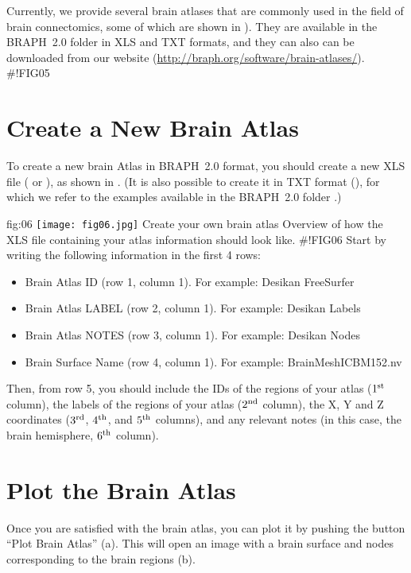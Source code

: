 \documentclass[justified]{tufte-handout}
\begin{document}
Currently, we provide several brain atlases that are commonly used in the field of brain connectomics, some of which are shown in ). 
They are available in the BRAPH~2.0 folder  in XLS and TXT formats, and they can also can be downloaded from our website (\url{http://braph.org/software/brain-atlases/}).
#!FIG05
\clearpage
\section{Create a New Brain Atlas}

To create a new brain Atlas in BRAPH~2.0 format, you should create a new XLS file ( or ), as shown in . 
(It is also possible to create it in TXT format (), for which we refer to the examples available in the BRAPH~2.0 folder .)

	{fig:06}
	{\texttt{[image: fig06.jpg]}}
	{Create your own brain atlas}
	{
	Overview of how the XLS file containing your atlas information should look like.
	}
#!FIG06
Start by writing the following information in the first 4 rows:
\begin{itemize}

\item Brain Atlas ID (row 1, column 1). 
For example: Desikan FreeSurfer

\item Brain Atlas LABEL (row 2, column 1). 
For example: Desikan Labels

\item Brain Atlas NOTES (row 3, column 1).
For example: Desikan Nodes

\item Brain Surface Name (row 4, column 1).
For example: BrainMeshICBM152.nv

\end{itemize}
Then, from row 5, you should include the IDs of the regions of your atlas ($1^{\rm st}$ column), the labels of the regions of your atlas ($2^{\rm nd}$ column), the X, Y and Z coordinates ($3^{\rm rd}$, $4^{\rm th}$, and $5^{\rm th}$ columns), and any relevant notes (in this case, the brain hemisphere, $6^{\rm th}$ column).	

\clearpage
\section{Plot the Brain Atlas}

Once you are satisfied with the brain atlas, you can plot it by pushing the button ``Plot Brain Atlas'' (a). 
This will open an image with a brain surface and nodes corresponding to the brain regions (b).
\end{document}
